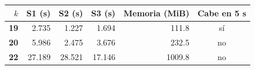 \renewcommand{\arraystretch}{1.2}
\begin{tabular}{|r|r|r|r|r|c|}
\hline
\rowcolor{gray!20} \textbf{$k$} & \textbf{S1 (s)} & \textbf{S2 (s)} & \textbf{S3 (s)} & \textbf{Memoria (MiB)} & \textbf{Cabe en 5 s} \\
\hline
\textbf{19} & 2.735 & 1.227 & 1.694 & 111.8 & sí \\
\hline
\textbf{20} & 5.986 & 2.475 & 3.676 & 232.5 & no \\
\hline
\textbf{22} & 27.189 & 28.521 & 17.146 & 1009.8 & no \\
\hline
\end{tabular}

